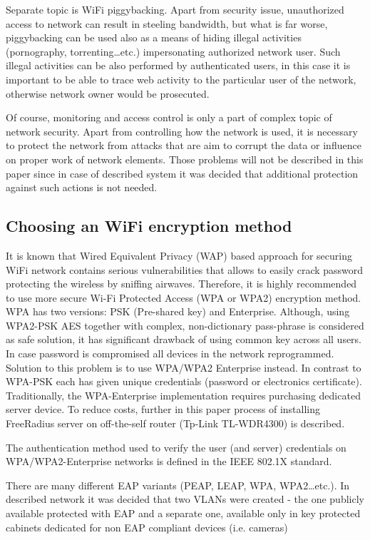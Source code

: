 \documentclass{llncs}
\begin{document}
Separate topic is WiFi piggybacking. Apart from security issue,
unauthorized access to network can result in steeling bandwidth, but what is far
worse, piggybacking can be used also as a means of hiding illegal activities
(pornography, torrenting\ldots etc.) impersonating authorized network user. Such
illegal activities can be also performed by authenticated users, in this case it is
important to be able to trace web activity to the particular user of the
network, otherwise network owner would be prosecuted. 

Of course, monitoring and access control is only a part of complex topic of
network security. Apart from controlling how the network is used, it is
necessary to protect the network from attacks that are aim to corrupt the data
or influence on proper work of network elements. Those problems will not be
described in this paper since in case of described system it was decided that additional protection against such actions is not needed.

\subsection{Choosing an WiFi encryption method}
It is known that Wired Equivalent Privacy (WAP) based approach for
securing WiFi network contains serious vulnerabilities that allows to
easily crack password protecting the wireless by sniffing airwaves.
Therefore, it is highly recommended to use more secure Wi-Fi Protected Access
(WPA or WPA2) encryption method. WPA has two versions: PSK
(Pre-shared key) and Enterprise. Although, using WPA2-PSK AES together
with complex, non-dictionary pass-phrase is considered as safe solution, it has
significant drawback of using common key across all users.
In case password is compromised all devices in the
network reprogrammed. Solution to this problem is to use WPA/WPA2 Enterprise
instead. In contrast to WPA-PSK each has given unique credentials
(password or electronics certificate). Traditionally, the WPA-Enterprise
implementation requires purchasing dedicated server device. To reduce
costs, further in this paper process of installing FreeRadius server on
off-the-self router (Tp-Link TL-WDR4300) is described.


The authentication method used to verify the user (and server) credentials on
WPA/WPA2-Enterprise networks is defined in the IEEE 802.1X standard.

There are many different EAP variants (PEAP, LEAP, WPA, WPA2\ldots etc.). In
described network it was decided that two VLANs were created - the one
publicly available protected with EAP and a separate one, available only in
key protected cabinets dedicated for non EAP compliant devices (i.e. cameras)
 
\end{document}
